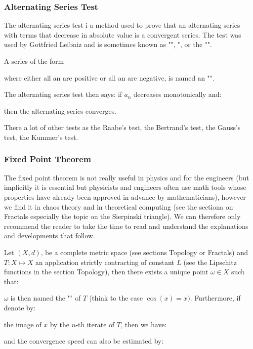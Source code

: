 	\subsubsection{Alternating Series Test}
	The alternating series test i a method used to prove that an alternating series with terms that decrease in absolute value is a convergent series. The test was used by Gottfried Leibniz and is sometimes known as "", ", or the "".
	
	A series of the form
	
	where either all an are positive or all an are negative, is named an "".

	The alternating series test then says: if $a_n$ decreases monotonically and:
	
 	then the alternating series converges.
	
	There a lot of other tests as the Raabe's test, the Bertrand's test, the Gauss's test, the Kummer's test.
	
	\subsubsection{Fixed Point Theorem}
	The fixed point theorem is not really useful in physics and for the engineers (but implicitly it is essential but physicists and engineers often use math tools whose properties have already been approved in advance by mathematicians), however we find it in chaos theory and in theoretical computing (see the sectiona on Fractals especially the topic on the Sierpinski triangle). We can therefore only recommend the reader to take the time to read and understand the explanations and developments that follow.
	
	Let $(X,d)$, be a complete metric space (see sections Topology or Fractals) and $T:X\mapsto X$ an application strictly contracting of constant $L$ (see the Lipschitz functions in the section Topology), then there exists a unique point $\omega\in X$ such that:
	
	$\omega$ is then named the "" of $T$ (think to the case $\cos(x)=x)$. Furthermore, if denote by:
	
	the image of $x$ by the $n$-th iterate of $T$, then we have:
	
	and the convergence speed can also be estimated by:
	
